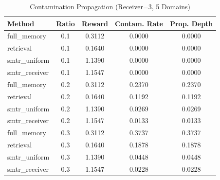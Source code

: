 \begin{table}[t]
\caption{Contamination Propagation (Receiver=3, 5 Domains)}
\label{tab:receiver3_contamination}
\centering
\begin{tabular}{l c c c c}
\toprule
Method & Ratio & Reward & Contam. Rate & Prop. Depth \\
\midrule
full\_memory & 0.1 & 0.3112 & 0.0000 & 0.0000 \\
retrieval & 0.1 & 0.1640 & 0.0000 & 0.0000 \\
smtr\_uniform & 0.1 & 1.1390 & 0.0000 & 0.0000 \\
smtr\_receiver & 0.1 & 1.1547 & 0.0000 & 0.0000 \\
\midrule
full\_memory & 0.2 & 0.3112 & 0.2370 & 0.2370 \\
retrieval & 0.2 & 0.1640 & 0.1192 & 0.1192 \\
smtr\_uniform & 0.2 & 1.1390 & 0.0269 & 0.0269 \\
smtr\_receiver & 0.2 & 1.1547 & 0.0133 & 0.0133 \\
\midrule
full\_memory & 0.3 & 0.3112 & 0.3737 & 0.3737 \\
retrieval & 0.3 & 0.1640 & 0.1878 & 0.1878 \\
smtr\_uniform & 0.3 & 1.1390 & 0.0448 & 0.0448 \\
smtr\_receiver & 0.3 & 1.1547 & 0.0228 & 0.0228 \\
\bottomrule
\end{tabular}
\end{table}
